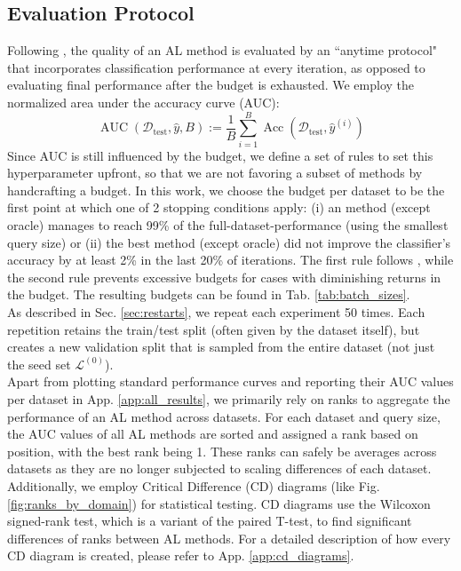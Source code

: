 \documentclass[]{article}
\newcommand{\D}{\mathcal{D}}
\newcommand{\LL}{\mathcal{L}}
\newcommand{\test}{\text{test}}
\begin{document}
\subsection{Evaluation Protocol}\label{sec:evaluation}
Following \cite{zhou2021towards}, the quality of an AL method is evaluated by an ``anytime protocol" that incorporates classification performance at every iteration, as opposed to evaluating final performance after the budget is exhausted.
We employ the normalized area under the accuracy curve (AUC):
\begin{equation}\label{eq:auc}
	\operatorname{AUC}(\D_\test, \hat y, B) := \frac{1}{B} \sum_{i=1}^{B} \operatorname{Acc}(\D_\test, \hat y^{(i)})
\end{equation}
Since AUC is still influenced by the budget, we define a set of rules to set this hyperparameter upfront, so that we are not favoring a subset of methods by handcrafting a budget.
In this work, we choose the budget per dataset to be the first point at which one of 2 stopping conditions apply: (i) an method (except oracle) manages to reach 99\% of the full-dataset-performance (using the smallest query size) or (ii) the best method (except oracle) did not improve the classifier's accuracy by at least 2\% in the last 20\% of iterations.
The first rule follows \cite{ji2023randomness}, while the second rule prevents excessive budgets for cases with diminishing returns in the budget.
The resulting budgets can be found in Tab. \ref{tab:batch_sizes}. \\ [1mm]
As described in Sec. \ref{sec:restarts}, we repeat each experiment 50 times.
Each repetition retains the train/test split (often given by the dataset itself), but creates a new validation split that is sampled from the entire dataset (not just the seed set $\LL^{(0)}$). \\ [1mm]
%
Apart from plotting standard performance curves and reporting their AUC values per dataset in App. \ref{app:all_results}, we primarily rely on ranks to aggregate the performance of an AL method across datasets.
For each dataset and query size, the AUC values of all AL methods are sorted and assigned a rank based on position, with the best rank being 1.
These ranks can safely be averages across datasets as they are no longer subjected to scaling differences of each dataset.
Additionally, we employ Critical Difference (CD) diagrams (like Fig. \ref{fig:ranks_by_domain}) for statistical testing.
CD diagrams \cite{IsmailFawaz2018deep} use the Wilcoxon signed-rank test, which is a variant of the paired T-test, to find significant differences of ranks between AL methods.
For a detailed description of how every CD diagram is created, please refer to App. \ref{app:cd_diagrams}. 
\end{document}
